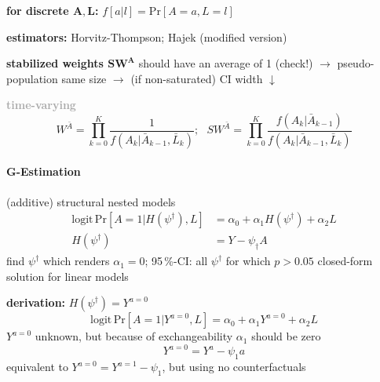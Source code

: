 \documentclass[8pt,twoside]{extarticle}
\begin{document}
\begin{multicols}{2}
 \textbf{for discrete $\boldsymbol{A, L}$:} $f\left[a|l\right] = \mathrm{Pr}\left[A=a,L=l\right]$

 \textbf{estimators:} Horvitz-Thompson; Hajek (modified version) %

 \textbf{stabilized weights $\boldsymbol{SW^A}$} should have an average of 1 (check!) $\rightarrow$ pseudo-population same size $\rightarrow$ (if non-saturated) CI width $\downarrow$ 

\vspace{0.2em}
 \colorbox{lightgray!20!white}{\begin{minipage}{28em}




\textbf{\textcolor{darkgray}{time-varying}}
$$ W^{\bar{A}} = \prod_{k=0}^K \frac{1}{f\left(A_k|\bar{A}_{k-1}, \bar{L}_k\right)}; \,\,\,\, SW^{\bar{A}} = \prod_{k=0}^K \frac{f\left(A_k|\bar{A}_{k-1}\right)}{f\left(A_k|\bar{A}_{k-1}, \bar{L}_k\right)}$$

\end{minipage}}



















\paragraph{G-Estimation} (additive) structural nested models %
\begin{align*}
\mathrm{logit} \, \mathrm{Pr}\left[A=1|H(\psi^\dagger), L\right] &= \alpha_0 + \alpha_1H(\psi^\dagger) + \alpha_2L \\
H(\psi^\dagger) &= Y - \psi_\dagger A
\end{align*}
find $\psi^\dagger$ which renders $\alpha_1=0$; 95\,\%-CI: all $\psi^\dagger$ for which $p>0.05$
closed-form solution for linear models


 \textbf{derivation:} $H(\psi^\dagger) = Y^{a=0}$
$$\mathrm{logit} \, \mathrm{Pr}\left[A=1|Y^{a=0}, L\right] = \alpha_0 + \alpha_1Y^{a=0} + \alpha_2L$$
$Y^{a=0}$ unknown, but because of exchangeability $\alpha_1$ should be zero
$$Y^{a=0} =Y^a - \psi_1 a$$
equivalent to $Y^{a=0} =Y^{a=1} - \psi_1$, but using no counterfactuals




\end{multicols}
\end{document}
